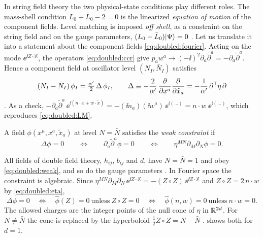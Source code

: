 In string field theory the two physical-state conditions play different roles. The mass-shell
condition $L_0+\bar L_0-2=0$ is the linearized \emph{equation of motion} of the component
fields. Level matching is imposed \emph{off shell}, as a constraint on the string field and on
the gauge parameters, $(L_0-\bar L_0)|\Psi\rangle=0$ . Let us translate it into a statement about the component fields
\eqref{eq:doubled:fourier}. Acting on the mode $\ee^{\ii Z\cdot\mathbb X}$, the operators
\eqref{eq:doubled:ccr} give $p_aw^a\to(-\ii)^2\partial_a\tilde\partial^a=-\partial_a
\tilde\partial^a$. Hence a component field at oscillator level $(N_I,\bar N_I)$ satisfies
\begin{equation}\label{eq:doubled:Delta}
(N_I-\bar N_I)\,\phi_I=\tfrac{\alpha'}{2}\,\Delta\,\phi_I,\qquad
\Delta\equiv-\frac{2}{\alpha'}\,\frac{\partial}{\partial x^a}\frac{\partial}{\partial\tilde x_a}
=-\frac1{\alpha'}\,\partial^{\mathsf T}\eta\,\partial
\end{equation}
. As a check,
$-\partial_a\tilde\partial^a\,\ee^{\ii(n\cdot x+w\cdot\tilde x)}=-(\ii n_a)(\ii w^a)\,
\ee^{\ii(\dots)}=n\cdot w\;\ee^{\ii(\dots)}$, which reproduces \eqref{eq:doubled:LM}.

\begin{definition}\label{def:doubled:weak}
A field $\phi(x^\mu,x^a,\tilde x_a)$ at level $N=\bar N$ satisfies the \emph{weak constraint} if
\begin{equation}\label{eq:doubled:weak}
\Delta\phi=0\qquad\Longleftrightarrow\qquad \partial_a\tilde\partial^a\phi=0
\qquad\Longleftrightarrow\qquad \eta^{MN}\partial_M\partial_N\phi=0 .
\end{equation}
\end{definition}

All fields of double field theory, $h_{ij}$, $b_{ij}$ and $d$, have $N=\bar N=1$ and obey
\eqref{eq:doubled:weak}, and so do the gauge parameters . In Fourier
space the constraint is algebraic. Since $\eta^{MN}\partial_M\partial_N\,\ee^{\ii Z\cdot\mathbb X}
=-(Z\circ Z)\,\ee^{\ii Z\cdot\mathbb X}$ and $Z\circ Z=2\,n\cdot w$ by \eqref{eq:doubled:eta},
\begin{equation}\label{eq:doubled:null}
\Delta\phi=0\quad\Longleftrightarrow\quad\hat\phi(Z)=0\ \text{unless}\ Z\circ Z=0
\quad\Longleftrightarrow\quad\hat\phi(n,w)=0\ \text{unless}\ n\cdot w=0 .
\end{equation}
The allowed charges are the integer points of the null cone of $\eta$ in
$\mathbb{R}^{2d}$. For $N\neq\bar N$ the cone is replaced by the hyperboloid
$\frac12Z\circ Z=N-\bar N$ .  shows both for $d=1$.


